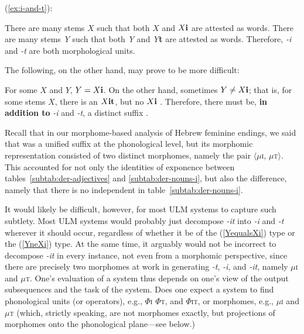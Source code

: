 (\ref{ex:i-and-t}): 
\begin{exe} \label{ex:observations1}
\ex There are many stems $X$ such that both $X$ and $X\text{\textbf{i}}$ are 
attested as words. \label{ex:Xi}
 \ex There are many stems \textit{Y} such that both \textit{Y} and \textit{Y}\textbf{t} 
 are attested as words. \label{ex:Yi}
\ex Therefore, \textit{-i} and \textit{-t} are both morphological units. \label{ex:i-and-t}
\end{exe}

The following, on the other hand, may prove to be more difficult:
\begin{exe} \label{ex:observations2}
\ex  For some $X$ and $Y$, $Y=X\text{\textbf{i}}$. \label{ex:YequalsXi} 
\ex  On the other hand, sometimes $Y \ne X\text{\textbf{i}}$; that is, for some stems 
$X$, there is an $X\text{\textbf{it}}$, but no $X\text{\textbf{i}}$ . \label{YneXi}
\ex Therefore, there must be, \textbf{in addition to} \textit{-i} and \textit{-t}, 
a distinct suffix .
\end{exe}
Recall that in our morphome-based analysis of Hebrew feminine endings, we said 
that  was a unified suffix at the phonological level, but its morphomic 
representation consisted of two distinct morphomes, namely the pair 
$\langle$$\mu$\textsc{i}, $\mu$\textsc{t}$\rangle$. This accounted
for not only the identities of exponence between tables~\ref{subtab:der-adjectives} 
and \ref{subtab:der-nouns-i}, but also the difference, namely that there is no independent
 in table~\ref{subtab:der-nouns-i}. 

It would likely be difficult, however, for most \ac{ULM} systems to capture such subtlety. 
Most \ac{ULM} systems would probably just decompose \textit{-it} 
into \textit{-i} and \textit{-t} wherever it should occur, regardless of whether it be of the
 (\ref{YequalsXi}) type or the (\ref{YneXi}) type. At the same time, it arguably would not be incorrect to decompose \textit{-it} in every instance, not even from a morphomic perspective,
since there are precisely two morphomes at work in generating \textit{-t}, \textit{-i}, and \textit{-it}, 
 namely $\mu$\textsc{i} and $\mu$\textsc{t}. 
One's evaluation of a system thus depends on one's view of the output subsequences and the task of the system. Does one 
expect a system to find phonological units (or operators), e.g., $\Phi$\textsc{i} $\Phi$\textsc{t}, and $\Phi$\textsc{it}, or 
morphomes, e.g., 
$\mu$\textsc{i} and $\mu$\textsc{t} (which, strictly speaking, are not morphomes exactly, but projections of morphomes onto 
the phonological plane---see below.)


